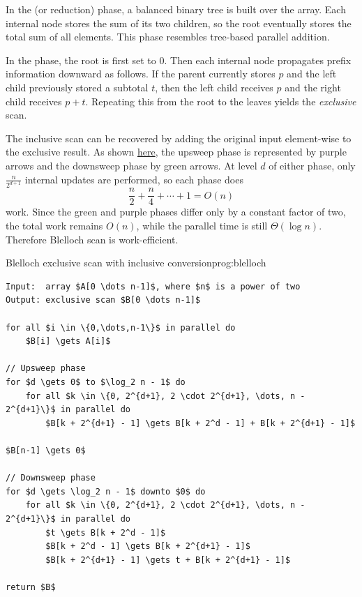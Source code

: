 In the  (or reduction) phase, a balanced binary tree is built over
the array. Each internal node stores the sum of its two children, so the root
eventually stores the total sum of all elements. This phase resembles tree-based
parallel addition.

In the  phase, the root is first set to $0$. Then each internal
node propagates prefix information downward as follows. If the parent currently
stores $p$ and the left child previously stored a subtotal $t$, then the left child
receives $p$ and the right child receives $p + t$. Repeating this from the root
to the leaves yields the \emph{exclusive} scan.

The inclusive scan can be recovered by adding the original input element-wise to
the exclusive result. As shown \hyperref[fig:blelloch-scan]{here}, the upsweep
phase is represented by purple arrows and the downsweep phase by green arrows.
At level $d$ of either phase, only $\frac{n}{2^{d+1}}$ internal updates are
performed, so each phase does
\[
\frac{n}{2} + \frac{n}{4} + \cdots + 1 = O(n)
\]
work. Since the green and purple phases differ only by a constant factor of two,
the total work remains $O(n)$, while the parallel time is still $\Theta(\log n)$.
Therefore Blelloch scan is work-efficient.

\begin{ppprogram}{Blelloch exclusive scan with inclusive conversion}{prog:blelloch}
\begin{lstlisting}[language=Pseudocode,style=pppseudocode]
Input:  array $A[0 \dots n-1]$, where $n$ is a power of two
Output: exclusive scan $B[0 \dots n-1]$

for all $i \in \{0,\dots,n-1\}$ in parallel do
    $B[i] \gets A[i]$

// Upsweep phase
for $d \gets 0$ to $\log_2 n - 1$ do
    for all $k \in \{0, 2^{d+1}, 2 \cdot 2^{d+1}, \dots, n - 2^{d+1}\}$ in parallel do
        $B[k + 2^{d+1} - 1] \gets B[k + 2^d - 1] + B[k + 2^{d+1} - 1]$

$B[n-1] \gets 0$

// Downsweep phase
for $d \gets \log_2 n - 1$ downto $0$ do
    for all $k \in \{0, 2^{d+1}, 2 \cdot 2^{d+1}, \dots, n - 2^{d+1}\}$ in parallel do
        $t \gets B[k + 2^d - 1]$
        $B[k + 2^d - 1] \gets B[k + 2^{d+1} - 1]$
        $B[k + 2^{d+1} - 1] \gets t + B[k + 2^{d+1} - 1]$

return $B$
\end{lstlisting}
\end{ppprogram}

